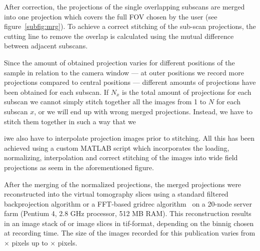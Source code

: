 After correction, the projections of the single overlapping subscans are merged into one projection which covers the full FOV chosen by the user (see figure~\ref{subfig:mrg}). To achieve a correct stitching of the sub-scan projections, the cutting line to remove the overlap is calculated using the mutual difference between adjacent subscans.

Since the amount of obtained projection varies for different positions of the sample in relation to the camera window --- at outer positions we record more projections compared to central positions --- different amounts of projections have been obtained for each subscan. If $N_x$ is the total amount of projections for each subscan we cannot simply stitch together all the images from 1 to $N$ for each subscan $x$, or we will end up with wrong merged projections. Instead, we have to stitch them together in such a way that we 



iwe also have to interpolate projection images prior to stitching. All this has been achieved using a custom MATLAB\textsuperscript{\textregistered} script which incorporates the loading, normalizing, interpolation and correct stitching of the images into wide field projections as seem in the aforementioned figure.

After the merging of the normalized projections, the merged projections were reconstructed into the virtual tomography slices using a standard filtered backprojection algorithm or a FFT-based gridrec algorithm~\cite{Dowd2003} on a 20-node server farm (Pentium 4, 2.8 GHz processor, 512 MB RAM). This reconstruction results in an image stack of  or  image slices in tif-format, depending on the binnig chosen at recording time. The size of the images recorded for this publication varies from $\times$ pixels up to $\times$ pixels.